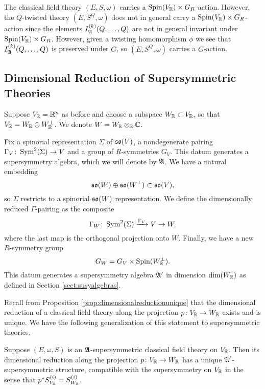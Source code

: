 \documentclass[10pt, oneside]{article}
\begin{document}
The classical field theory $(E, S, \omega)$ carries a $\mathrm{Spin}(V_\mathbb R)\times G_R$-action. However, the $Q$-twisted theory $(E, S^Q, \omega)$ does not in general carry a $\mathrm{Spin}(V_\mathbb R)\times G_R$-action since the elements $I_{\mathfrak A}^{(k)}(Q, \dots, Q)$ are not in general invariant under $\mathrm{Spin}(V_\mathbb R)\times G_R$. However, given a twisting homomorphism $\phi$ we see that $I_{\mathfrak A}^{(k)}(Q, \dots, Q)$ is preserved under $G$, so $(E, S^Q, \omega)$ carries a $G$-action.

\subsection{Dimensional Reduction of Supersymmetric Theories}

Suppose $V_\mathbb R=\mathbb R^n$ as before and choose a subspace $W_\mathbb R\subset V_\mathbb R$, so that $V_\mathbb R = W_\mathbb R\oplus W^\perp_\mathbb R$. We denote $W=W_{\mathbb R}\otimes_{\mathbb R} \mathbb C$.

Fix a spinorial representation $\Sigma$ of $\mathfrak{so}(V)$, a nondegenerate pairing $\Gamma_V\colon \operatorname{Sym}^2(\Sigma)\rightarrow V$ and a group of $R$-symmetries $G_V$.  This datum generates a supersymmetry algebra, which we will denote by $\mathfrak{A}$.  We have a natural embedding
\[\mathfrak{so}(W)\oplus \mathfrak{so}(W^{\perp})\subset \mathfrak{so}(V),\]
so $\Sigma$ restricts to a spinorial $\mathfrak{so}(W)$ representation. We define the dimensionally reduced $\Gamma$-pairing as the composite
\[\Gamma_W\colon \operatorname{Sym}^2(\Sigma)\xrightarrow{\Gamma_V} V\rightarrow W,\]
where the last map is the orthogonal projection onto $W$. Finally, we have a new $R$-symmetry group
\[G_W = G_V\times \mathrm{Spin}(W^\perp_\mathbb R).\]
This datum generates a supersymmetry algebra $\mathfrak{A}'$ in dimension $\mathrm{dim}(W_\mathbb R)$ as defined in Section \ref{sect:susyalgebras}.

Recall from Proposition \ref{prop:dimensionalreductionunique} that the dimensional reduction of a classical field theory along the projection $p\colon V_\mathbb R\rightarrow W_\mathbb R$ exists and is unique. We have the following generalization of this statement to supersymmetric theories.

\begin{prop} \label{prop:susydimlred}
Suppose $(E, \omega, S)$ is an $\mathfrak{A}$-supersymmetric classical field theory on $V_\mathbb R$. Then its dimensional reduction along the projection $p\colon V_\mathbb R\rightarrow W_\mathbb R$ has a unique $\mathfrak{A}'$-supersymmetric structure, compatible with the supersymmetry on $V_\mathbb R$ in the sense that $p^*S^{(i)}_{V_\mathbb R} = S^{(i)}_{W_\mathbb R}$.
\end{prop}
\end{document}
